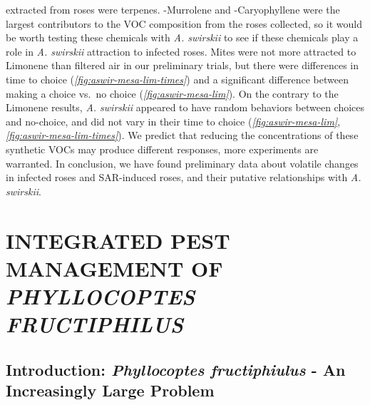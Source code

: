 \documentclass[12pt,final,CPage]{ufthesis}
\begin{document}
{extracted from roses were terpenes. \textgamma-Murrolene and \textbeta-Caryophyllene were the largest contributors to the VOC composition from the roses collected, so it would be worth testing these chemicals with \emph{A. swirskii} to see if these chemicals play a role in \emph{A. swirskii} attraction to infected roses. Mites were not more attracted to Limonene than filtered air in our preliminary trials, but there were differences in time to choice (\emph{\ref{fig:aswir-mesa-lim-times}}) and a significant difference between making a choice vs.~no choice (\emph{\ref{fig:aswir-mesa-lim}}). On the contrary to the Limonene results, \emph{A. swirskii} appeared to have random behaviors between choices and no-choice, and did not vary in their time to choice (\emph{\ref{fig:aswir-mesa-lim}}, \emph{\ref{fig:aswir-mesa-lim-times}}). We predict that reducing the concentrations of these synthetic VOCs may produce different responses, more experiments are warranted. In conclusion, we have found preliminary data about volatile changes in infected roses and SAR-induced roses, and their putative relationships with \emph{A. swirskii}.

  \hypertarget{intro-asm-ipm-pfruct}{%
  \chapter{\texorpdfstring{INTEGRATED PEST MANAGEMENT OF \emph{PHYLLOCOPTES FRUCTIPHILUS}}{INTEGRATED PEST MANAGEMENT OF PHYLLOCOPTES FRUCTIPHILUS}}\label{intro-asm-ipm-pfruct}}

  \hypertarget{intro-ipm-pfruct}{%
  \section{\texorpdfstring{Introduction: \emph{Phyllocoptes fructiphiulus} - An Increasingly Large Problem}{Introduction: Phyllocoptes fructiphiulus - An Increasingly Large Problem}}\label{intro-ipm-pfruct}}

}
\end{document}
